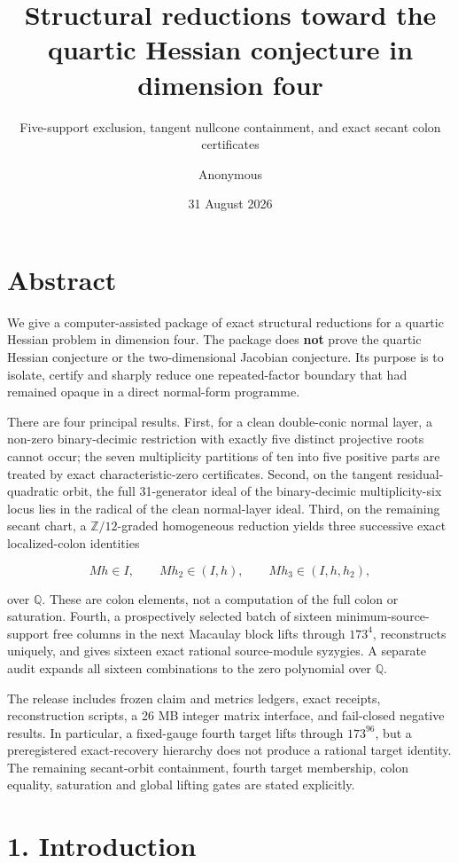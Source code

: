 \documentclass[
  11pt,
]{article}
\title{Structural reductions toward the quartic Hessian conjecture in
dimension four}
\subtitle{Five-support exclusion, tangent nullcone containment, and
exact secant colon certificates}
\author{Anonymous}
\date{31 August 2026}
\begin{document}
\maketitle

\section{Abstract}\label{abstract}

We give a computer-assisted package of exact structural reductions for a
quartic Hessian problem in dimension four. The package does \textbf{not}
prove the quartic Hessian conjecture or the two-dimensional Jacobian
conjecture. Its purpose is to isolate, certify and sharply reduce one
repeated-factor boundary that had remained opaque in a direct
normal-form programme.

There are four principal results. First, for a clean double-conic normal
layer, a non-zero binary-decimic restriction with exactly five distinct
projective roots cannot occur; the seven multiplicity partitions of ten
into five positive parts are treated by exact characteristic-zero
certificates. Second, on the tangent residual-quadratic orbit, the full
31-generator ideal of the binary-decimic multiplicity-six locus lies in
the radical of the clean normal-layer ideal. Third, on the remaining
secant chart, a \(\mathbb Z/12\)-graded homogeneous reduction yields
three successive exact localized-colon identities

\[
Mh\in I,\qquad Mh_2\in (I,h),\qquad Mh_3\in (I,h,h_2),
\]

over \(\mathbb Q\). These are colon elements, not a computation of the
full colon or saturation. Fourth, a prospectively selected batch of
sixteen minimum-source-support free columns in the next Macaulay block
lifts through \(173^4\), reconstructs uniquely, and gives sixteen exact
rational source-module syzygies. A separate audit expands all sixteen
combinations to the zero polynomial over \(\mathbb Q\).

The release includes frozen claim and metrics ledgers, exact receipts,
reconstruction scripts, a 26 MB integer matrix interface, and
fail-closed negative results. In particular, a fixed-gauge fourth target
lifts through \(173^{96}\), but a preregistered exact-recovery hierarchy
does not produce a rational target identity. The remaining secant-orbit
containment, fourth target membership, colon equality, saturation and
global lifting gates are stated explicitly.

\section{1. Introduction}\label{introduction}
\end{document}
